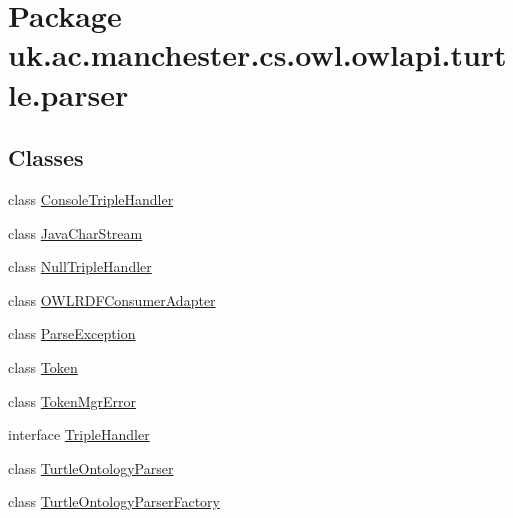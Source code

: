 \hypertarget{namespaceuk_1_1ac_1_1manchester_1_1cs_1_1owl_1_1owlapi_1_1turtle_1_1parser}{\section{Package uk.\-ac.\-manchester.\-cs.\-owl.\-owlapi.\-turtle.\-parser}
\label{namespaceuk_1_1ac_1_1manchester_1_1cs_1_1owl_1_1owlapi_1_1turtle_1_1parser}
}
\subsection*{Classes}
\begin{DoxyCompactItemize}
\item 
class \hyperlink{classuk_1_1ac_1_1manchester_1_1cs_1_1owl_1_1owlapi_1_1turtle_1_1parser_1_1_console_triple_handler}{Console\-Triple\-Handler}
\item 
class \hyperlink{classuk_1_1ac_1_1manchester_1_1cs_1_1owl_1_1owlapi_1_1turtle_1_1parser_1_1_java_char_stream}{Java\-Char\-Stream}
\item 
class \hyperlink{classuk_1_1ac_1_1manchester_1_1cs_1_1owl_1_1owlapi_1_1turtle_1_1parser_1_1_null_triple_handler}{Null\-Triple\-Handler}
\item 
class \hyperlink{classuk_1_1ac_1_1manchester_1_1cs_1_1owl_1_1owlapi_1_1turtle_1_1parser_1_1_o_w_l_r_d_f_consumer_adapter}{O\-W\-L\-R\-D\-F\-Consumer\-Adapter}
\item 
class \hyperlink{classuk_1_1ac_1_1manchester_1_1cs_1_1owl_1_1owlapi_1_1turtle_1_1parser_1_1_parse_exception}{Parse\-Exception}
\item 
class \hyperlink{classuk_1_1ac_1_1manchester_1_1cs_1_1owl_1_1owlapi_1_1turtle_1_1parser_1_1_token}{Token}
\item 
class \hyperlink{classuk_1_1ac_1_1manchester_1_1cs_1_1owl_1_1owlapi_1_1turtle_1_1parser_1_1_token_mgr_error}{Token\-Mgr\-Error}
\item 
interface \hyperlink{interfaceuk_1_1ac_1_1manchester_1_1cs_1_1owl_1_1owlapi_1_1turtle_1_1parser_1_1_triple_handler}{Triple\-Handler}
\item 
class \hyperlink{classuk_1_1ac_1_1manchester_1_1cs_1_1owl_1_1owlapi_1_1turtle_1_1parser_1_1_turtle_ontology_parser}{Turtle\-Ontology\-Parser}
\item 
class \hyperlink{classuk_1_1ac_1_1manchester_1_1cs_1_1owl_1_1owlapi_1_1turtle_1_1parser_1_1_turtle_ontology_parser_factory}{Turtle\-Ontology\-Parser\-Factory}

\end{DoxyCompactItemize}
